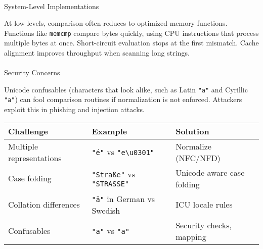 \documentclass[
  letterpaper,
  DIV=11,
  numbers=noendperiod]{scrreprt}
\makeatletter
\let\oldparagraph\paragraph
\renewcommand{\paragraph}{
    \@ifstar
      \xxxParagraphStar
      \xxxParagraphNoStar
  }
\newcommand{\xxxParagraphStar}[1]{\oldparagraph*{#1}\mbox{}}
\newcommand{\xxxParagraphNoStar}[1]{\oldparagraph{#1}\mbox{}}
\makeatother
\begin{document}
\paragraph{System-Level
Implementations}\label{system-level-implementations}

At low levels, comparison often reduces to optimized memory functions.
Functions like \texttt{memcmp} compare bytes quickly, using CPU
instructions that process multiple bytes at once. Short-circuit
evaluation stops at the first mismatch. Cache alignment improves
throughput when scanning long strings.

\paragraph{Security Concerns}\label{security-concerns}

Unicode confusables (characters that look alike, such as Latin
\texttt{"a"} and Cyrillic \texttt{"а"}) can fool comparison routines if
normalization is not enforced. Attackers exploit this in phishing and
injection attacks.

\begin{longtable}[]{@{}
  >{\raggedright\arraybackslash}p{}
  >{\raggedright\arraybackslash}p{}
  >{\raggedright\arraybackslash}p{}@{}}
\toprule\noalign{}
\begin{minipage}[b]{\linewidth}\raggedright
Challenge
\end{minipage} & \begin{minipage}[b]{\linewidth}\raggedright
Example
\end{minipage} & \begin{minipage}[b]{\linewidth}\raggedright
Solution
\end{minipage} \\
\midrule\noalign{}
\endhead
\bottomrule\noalign{}
\endlastfoot
Multiple representations & \texttt{"é"} vs
\texttt{"e\textbackslash{}u0301"} & Normalize (NFC/NFD) \\
Case folding & \texttt{"Straße"} vs \texttt{"STRASSE"} & Unicode-aware
case folding \\
Collation differences & \texttt{"ä"} in German vs Swedish & ICU locale
rules \\
Confusables & \texttt{"a"} vs \texttt{"а"} & Security checks, mapping \\
\end{longtable}
\end{document}
